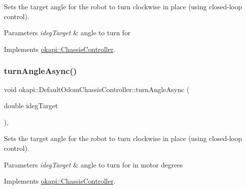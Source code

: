 Sets the target angle for the robot to turn clockwise in place (using closed-\/loop control).


\begin{DoxyParams}{Parameters}
{\em ideg\+Target} & angle to turn for \\
\hline
\end{DoxyParams}


Implements \mbox{\hyperlink{classokapi_1_1ChassisController_a87fc1f88bf06340d8f022a8c185b5e87}{okapi\+::\+Chassis\+Controller}}.

\mbox{\label{classokapi_1_1DefaultOdomChassisController_a948978204fc6f2a2443025dfdb0241b1}} 
\subsubsection{\texorpdfstring{turnAngleAsync()}{turnAngleAsync()}\hspace{0.1cm}{\footnotesize\ttfamily [2/2]}}
{\footnotesize\ttfamily void okapi\+::\+Default\+Odom\+Chassis\+Controller\+::turn\+Angle\+Async (\begin{DoxyParamCaption}\item[{double}]{ideg\+Target }\end{DoxyParamCaption})\hspace{0.3cm}{\ttfamily [override]}, {\ttfamily [virtual]}}

Sets the target angle for the robot to turn clockwise in place (using closed-\/loop control).


\begin{DoxyParams}{Parameters}
{\em ideg\+Target} & angle to turn for in motor degrees \\
\hline
\end{DoxyParams}


Implements \mbox{\hyperlink{classokapi_1_1ChassisController_a35cadd99478629637b4bd3a5e709871a}{okapi\+::\+Chassis\+Controller}}.

\mbox{\label{classokapi_1_1DefaultOdomChassisController_aaf6e4d74384b87510d35b639e45f9dc2}} 
